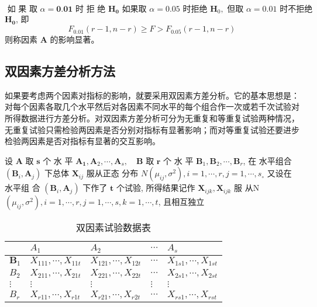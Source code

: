 $\text { 如 果 取 } \alpha=\mathbf{0 . 0 1} \text { 时 拒 绝 } \boldsymbol{H}_{\mathbf{0}}
\text { 如果取 } \alpha=0.05 \text { 时拒绝 } \boldsymbol{H}_{0}, \text { 但取 } \alpha=0.01 \text { 时不拒绝 }$
\( \boldsymbol{H}_{\mathbf{0}} \), 即
$$
F_{0.01}(r-1, n-r) \geq F>F_{0.05}(r-1, n-r)
$$
则称因素 \( \boldsymbol{A} \) 的影响显著。

\subsection{双因素方差分析方法}

如果要考虑两个因素对指标的影响，就要采用双因素方差分析。它的基本思想是：对每个因素各取几个水平然后对各因素不同水平的每个组合作一次或若千次试验对所得数据进行方差分析。对双因素方差分析可分为无重复和等重复试验两种情况，无重复试验只需检验两因素是否分别对指标有显著影响；而对等重复试验还要进步检验两因素是否对指标有显著的交互影响。

设 \( \boldsymbol{A} \) 取 \( \boldsymbol{s} \) 个 水 平 \( \boldsymbol{A}_{\mathbf{1}}, \boldsymbol{A}_{2}, \cdots, \boldsymbol{A}_{s}, \quad \boldsymbol{B} \) 取 \( \boldsymbol{r} \) 个 水 平
\( \boldsymbol{B}_{1}, \boldsymbol{B}_{2}, \cdots, \boldsymbol{B}_{r} \), 在 水平组合 \( \left(\boldsymbol{B}_{i}, \boldsymbol{A}_{j}\right) \) 下总体 \( \boldsymbol{X}_{i j} \) 服从正态
分布 \( N\left(\mu_{i j}, \sigma^{2}\right), i=1, \cdots, r, j=1, \cdots, s_{\circ} \) 又设在水平组
合 \( \left(\boldsymbol{B}_{i}, \boldsymbol{A}_{j}\right) \) 下作了 \( \boldsymbol{t} \) 个试验, 所得结果记作 \( \boldsymbol{X}_{i j k}, \boldsymbol{X}_{i j k} \) 服
从N \( \left(\mu_{i j}, \sigma^{2}\right), i=1, \cdots, r, j=1, \cdots, s, k=1, \cdots, t \), 且相互独立

\begin{table}
        \caption{双因素试验数据表}
        \begin{tabular}{l|llll}
        \hline & \( A_{1} \) & \( A_{2} \) & \( \cdots \) & \( A_{s} \) \\
        \hline \( \boldsymbol{B}_{1} \) & \( X_{111}, \cdots, X_{11 t} \) & \( X_{121}, \cdots, X_{12 t} \) & \( \cdots \) & \( X_{1 s 1}, \cdots, X_{1 s t} \) \\
        \( B_{2} \) & \( X_{211}, \cdots, X_{21 t} \) & \( X_{221}, \cdots, X_{22 t} \) & \( \cdots \) & \( X_{2 s 1}, \cdots, X_{2 s t} \) \\
        \( \vdots \) & \( \vdots \) & \( \vdots \) & \( \vdots \) & \( \vdots \) \\
        \( B_{r} \) & \( X_{r 11}, \cdots, X_{r 1 t} \) & \( X_{r 21}, \cdots, X_{r 2 t} \) & \( \cdots \) & \( X_{r s 1}, \cdots, X_{r s t} \) \\
        \hline
        \end{tabular}
\end{table}

